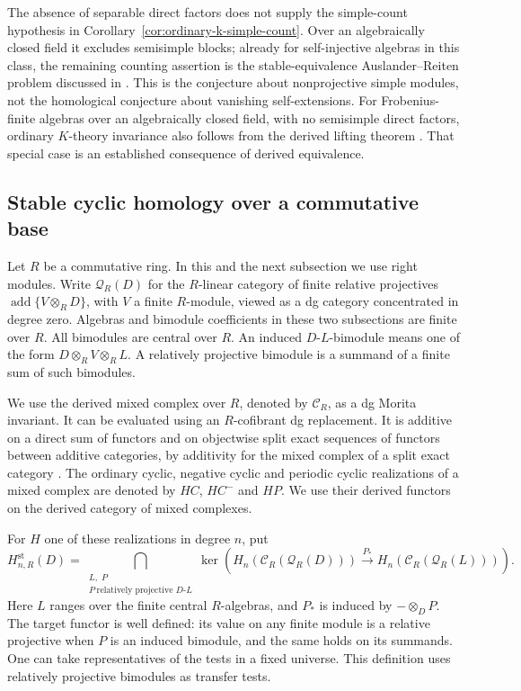 \documentclass[12pt,a4paper,english,reqno]{amsart}
\numberwithin{equation}{section}
\theoremstyle{plain}
\theoremstyle{definition}
\begin{document}
The absence of separable direct factors does not supply the
simple-count hypothesis in Corollary~\ref{cor:ordinary-k-simple-count}.
Over an algebraically closed field it excludes semisimple blocks;
already for self-injective algebras in this class, the remaining
counting assertion is the stable-equivalence Auslander--Reiten
problem discussed in \cite{LiuZhouZimmermann2012,LiXi2026Centralizer}.
This is the conjecture about nonprojective simple modules, not the
homological conjecture about vanishing self-extensions.
For Frobenius-finite algebras over an algebraically closed field,
with no semisimple direct factors, ordinary $K$-theory invariance
also follows from the derived lifting theorem
\cite[Theorem~1.1]{HuXi2018II}. That special case is an established
consequence of derived equivalence.

\subsection{Stable cyclic homology over a commutative base}
\label{subsec:relative-stable-cyclic}

Let $R$ be a commutative ring. In this and the next subsection
we use right modules. Write $\mathcal Q_R(D)$ for the $R$-linear
category of finite relative projectives
$\operatorname{add}\{V\otimes_R D\}$, with $V$ a finite
$R$-module, viewed as a dg category concentrated in degree zero.
Algebras and bimodule coefficients in these two subsections
are finite over $R$. All bimodules are central over $R$.
An induced $D$-$L$-bimodule means one of the form
$D\otimes_R V\otimes_R L$. A relatively projective bimodule
is a summand of a finite sum of such bimodules.

We use the derived mixed complex over $R$, denoted by
$\mathcal C_R$, as a dg Morita invariant. It can be evaluated
using an $R$-cofibrant dg replacement. It is additive on a
direct sum of functors and on objectwise split exact
sequences of functors between additive categories, by
additivity for the mixed complex of a split exact category
\cite{KellerCyclicExact,TabuadaGaloisAdditive}.
The ordinary cyclic, negative cyclic and periodic cyclic
realizations of a mixed complex are denoted by $HC$, $HC^-$
and $HP$. We use their derived functors on the derived
category of mixed complexes.

For $H$ one of these realizations in degree $n$, put
\[
 H^{\mathrm{st}}_{n,R}(D)=
 \bigcap_{\substack{L,\;P\\
      P\ \text{relatively projective }D\text{-}L}}
 \ker\!\left(
 H_n(\mathcal C_R(\mathcal Q_R(D)))
   \xrightarrow{\,P_*\,}
 H_n(\mathcal C_R(\mathcal Q_R(L)))\right).
\]
Here $L$ ranges over the finite central $R$-algebras, and
$P_*$ is induced by $-\otimes_D P$. The target functor is
well defined: its value on any finite module is a relative
projective when $P$ is an induced bimodule, and the same
holds on its summands. One can take representatives of
the tests in a fixed universe. This definition uses
relatively projective bimodules as transfer tests.
\end{document}
